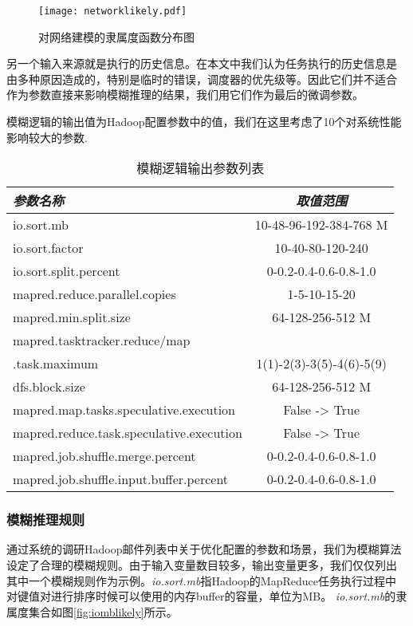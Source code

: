 \begin{figure}[h!]
  \centering
  \texttt{[image: networklikely.pdf]}
  \caption{对网络建模的隶属度函数分布图}
  \label{fig:networklikelyhood}
\end{figure}

另一个输入来源就是执行的历史信息。在本文中我们认为任务执行的历史信息是
由多种原因造成的，特别是临时的错误，调度器的优先级等。因此它们并不适合
作为参数直接来影响模糊推理的结果，我们用它们作为最后的微调参数。

模糊逻辑的输出值为Hadoop配置参数中的值，我们在这里考虑了10个对系统性能
影响较大的参数\cite{hadoopconfexample, hadooptuning, speeduphadoop}.

\begin{table}[h!]\small
  \caption{模糊逻辑输出参数列表}
  \label{table:outputvars}
  \centering
  \begin{tabular}{|l c|}
    \hline
    \textit{参数名称} & \textit{取值范围} \\
    \hline
    io.sort.mb & 10-48-96-192-384-768 M \\
    \hline
    io.sort.factor & 10-40-80-120-240\\
    \hline
    io.sort.split.percent & 0-0.2-0.4-0.6-0.8-1.0\\
    \hline
    mapred.reduce.parallel.copies & 1-5-10-15-20\\
    \hline
    mapred.min.split.size & 64-128-256-512 M\\
    \hline
    mapred.tasktracker.reduce/map & \\
    .task.maximum & 1(1)-2(3)-3(5)-4(6)-5(9)\\
    \hline
    dfs.block.size & 64-128-256-512 M\\
    \hline
    mapred.map.tasks.speculative.execution & False -> True \\
    \hline
    mapred.reduce.task.speculative.execution & False -> True\\
    \hline
    mapred.job.shuffle.merge.percent & 0-0.2-0.4-0.6-0.8-1.0\\
    \hline
    mapred.job.shuffle.input.buffer.percent & 0-0.2-0.4-0.6-0.8-1.0\\
    \hline
  \end{tabular}
\end{table}

\subsubsection{模糊推理规则}
通过系统的调研Hadoop邮件列表中关于优化配置的参数和场景，我们为模糊算法
设定了合理的模糊规则。由于输入变量数目较多，输出变量更多，我们仅仅列出
其中一个模糊规则作为示例。\textit{io.sort.mb}指Hadoop的MapReduce任务执行过程中
对键值对进行排序时候可以使用的内存buffer的容量，单位为MB。
\textit{io.sort.mb}的隶属度集合如图\ref{fig:iomblikely}所示。

